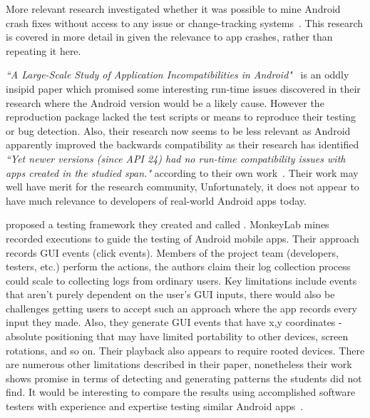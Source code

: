 More relevant research investigated whether it was possible to mine Android crash fixes without access to any issue or change-tracking systems~. This research is covered in more detail in  given the relevance to app crashes, rather than repeating it here. %

\emph{``A Large-Scale Study of Application Incompatibilities in Android"}~\cite{cai2019_large_scale_study_of_android_incompatibilities} is an oddly insipid paper which promised some interesting run-time issues discovered in their research where the Android version would be a likely cause. However the reproduction package lacked the test scripts or means to reproduce their testing or bug detection. Also, their research now seems to be less relevant as Android apparently improved the backwards compatibility as their research has identified \emph{``Yet newer versions (since API 24) had no run-time compatibility issues with apps created in the studied span."} according to their own work~. Their work may well have merit for the research community, Unfortunately, it does not appear to have much relevance to developers of real-world Android apps today.

\citeauthor{linares2015_mining_android_app_execution_traces_etc} proposed a testing framework they created and called . MonkeyLab mines recorded executions to guide the testing of Android mobile apps. Their approach records GUI events (click events). Members of the project team (developers, testers, etc.) perform the actions, the authors claim their log collection process could scale to collecting logs from ordinary users. Key limitations include events that aren't purely dependent on the user's GUI inputs, there would also be challenges getting users to accept such an approach where the app records every input they made. Also, they generate GUI events that have x,y coordinates - absolute positioning that may have limited portability to other devices, screen rotations, and so on. Their playback also appears to require rooted devices. There are numerous other limitations described in their paper, nonetheless their work shows promise in terms of detecting and generating patterns the students did not find. It would be interesting to compare the results using accomplished software testers with experience and expertise testing similar Android apps~.

